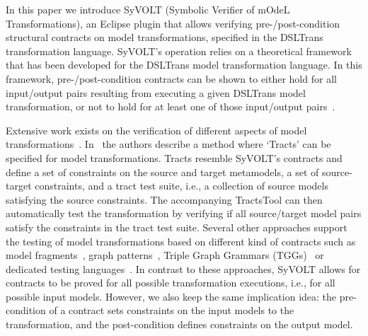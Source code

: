 In this paper we introduce SyVOLT (Symbolic Verifier of mOdeL Transformations),
an Eclipse plugin that allows verifying pre-/post-condition structural
contracts on model transformations, specified in the DSLTrans transformation
language. SyVOLT's operation relies on a theoretical framework that has been
developed for the DSLTrans model transformation language. In this framework,
pre-/post-condition contracts can be shown to either hold for all input/output pairs resulting from
executing a given DSLTrans model transformation, or not to hold for at least
one of those input/output pairs~\cite{Lucio2014}.


Extensive work exists on the verification of different aspects of model
transformations~\cite{AmraniLSCDVTC12}. In~\cite{Vallecillo2012} the
authors describe a method where `Tracts' can be specified for model
transformations. Tracts resemble SyVOLT's contracts and define a set
of constraints on the source and target metamodels, a set of source-target constraints, and a tract test suite, i.e., a collection of source models
satisfying the source constraints. The accompanying TractsTool can then
automatically test the transformation by verifying if all source/target model
pairs satisfy the constraints in the tract test suite.
Several other approaches support the testing of model transformations based
on different kind of contracts such as model fragments~\cite{Mottu2008}, graph patterns~\cite{Guerra12,BaloghBCGHMPPRVa10},
Triple Graph Grammars (TGGs)~\cite{WieberAS14} or dedicated testing
languages~\cite{Garcia-Dominguez11}. In contrast to these approaches, SyVOLT
allows for contracts to be proved for all possible transformation executions, i.e., for all possible
input models. However, we also keep the same implication idea: the pre-condition of
a contract sets constraints on the input models to the transformation, and the post-condition defines constraints on the output model.

